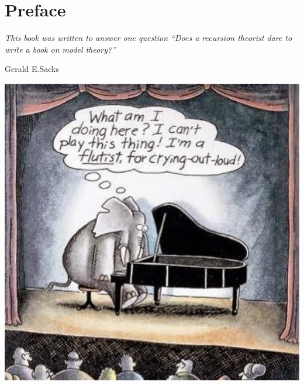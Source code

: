\documentclass[creche.tex]{subfiles}
\begin{document}
\chapter*{Preface}



\begin{minipage}{0.5\textwidth}\sl
This book was written to answer one question ``Does a recursion theorist dare to write a book on model theory?''

\hfill Gerald E.\@ Sacks
\vspace*{15ex}
\end{minipage}
\hfill
\begin{minipage}{0.45\textwidth}\sl
\includegraphics[width=.9\textwidth]{elephant_playing_piano.jpg}
\end{minipage}
\medskip

\label{praface}

% 
% 
%
\end{document}
